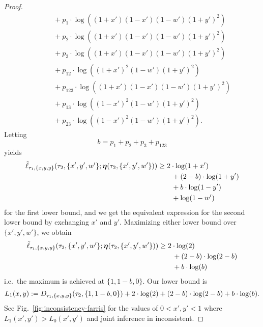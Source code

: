 \begin{proof}
\begin{align*}
    &\qquad + p_{1}          \cdot\log((1+x')(1-x')(1-w')(1+y')^2) \\
    &\qquad + p_{2}          \cdot\log((1+x')(1-x')(1-w')(1+y')^2) \\
    &\qquad + p_{3}          \cdot\log((1+x')(1-x')(1-w')(1+y')^2) \\
    &\qquad + p_{12}         \cdot\log((1+x')^2    (1-w')(1+y')^2) \\
    &\qquad + p_{123}        \cdot\log((1+x')(1-x')(1-w')(1+y')^2)\\
    &\qquad + p_{13}         \cdot\log((1-x')^2    (1-w')(1+y')^2) \\
    &\qquad + p_{23}         \cdot\log((1-x')^2    (1-w')(1+y')^2).
\end{align*}
Letting
$$
b = p_{1}+p_{2}+p_{3}+p_{123}
$$
yields
\begin{align*}
    \tilde{\ell}_{\tau_1,\{x,y,y\}}(\tau_2, \{x',y',w'\}; \boldsymbol\eta(\tau_2,\{x',y',w'\}))
    &\ge      2\cdot\log(1+x') \\
    &\qquad + (2-b)  \cdot\log(1+y') \\
    &\qquad + b      \cdot\log(1-y') \\
    &\qquad + \log(1-w')
\end{align*}
for the first lower bound, and we get the equivalent expression for the second lower bound by exchanging $x'$ and $y'$.
Maximizing either lower bound over $\{x',y',w'\}$, we obtain
\begin{align*}
    \tilde{\ell}_{\tau_1,\{x,y,y\}}(\tau_2, \{x',y',w'\}; \boldsymbol\eta(\tau_2,\{x',y',w'\}))
    &\ge      2\cdot\log(2) \\
    &\qquad + (2-b)  \cdot\log(2-b) \\
    &\qquad + b      \cdot\log(b)
\end{align*}
%
i.e.\ the maximum is achieved at $\{1,1-b,0\}$.
Our lower bound is
$$
L_1(x, y) := D_{\tau_1,\{x,y,y\}}(\tau_2,\{1,1-b,0\}) + 2\cdot\log(2) + (2-b)\cdot\log(2-b) + b\cdot\log(b).
$$
See Fig.~\ref{fig:inconsistency-farris} for the values of $0 < x', y' < 1$ where $L_1(x', y') > L_0(x', y')$ and joint inference in inconsistent.
\end{proof}

